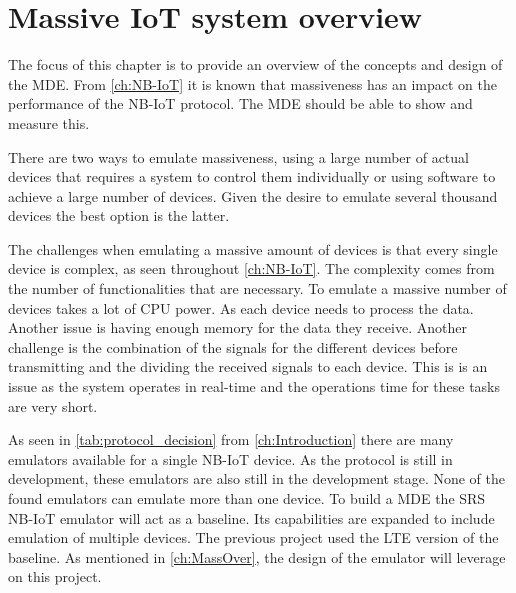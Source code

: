 \chapter{Massive IoT system overview}
\label{ch:MassOver}
 

The focus of this chapter is to provide an overview of the concepts and design of the \gls{MDE}. From \autoref{ch:NB-IoT} it is known that massiveness has an impact on the performance of the NB-IoT protocol. The MDE should be able to show and measure this.


There are two ways to emulate massiveness, using a large number of actual devices that requires a system to control them individually or using software to achieve a large number of devices. Given the desire to emulate several thousand devices the best option is the latter.

The challenges when emulating a massive amount of devices is that every single device is complex, as seen throughout \autoref{ch:NB-IoT}. The complexity comes from the number of functionalities that are necessary. To emulate a massive number of devices takes a lot of CPU power. As each device needs to process the data. Another issue is having enough memory for the data they receive. Another challenge is the combination of the signals for the different devices before transmitting and the dividing the received signals to each device. This is is an issue as the system operates in real-time and the operations time for these tasks are very short. 


As seen in \autoref{tab:protocol_decision} from \autoref{ch:Introduction} there are many emulators available for a single NB-IoT device. As the protocol is still in development, these emulators are also still in the development stage. None of the found emulators can emulate more than one device. To build a \gls{MDE} the SRS NB-IoT emulator will act as a baseline. Its capabilities are expanded to include emulation of multiple devices. The previous project used the LTE version of the baseline\citep{thesis_report}. As mentioned in \autoref{ch:MassOver}, the design of the emulator will leverage on this project.

